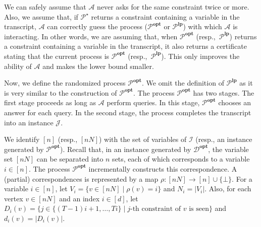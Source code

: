 \documentclass[letterpaper, 11pt]{article}
\newcommand{\calA}{\mathcal{A}}
\newcommand{\calD}{\mathcal{D}}
\newcommand{\calI}{\mathcal{I}}
\newcommand{\calJ}{\mathcal{J}}
\newcommand{\calP}{\mathcal{P}}
\newcommand{\lp}{\mathbf{lp}}
\newcommand{\opt}{\mathbf{opt}}
\begin{document}
We can safely assume that $\calA$ never asks for the same constraint twice or more.
Also, we assume that,
if $\calP^{\star}$ returns a constraint containing a variable in the transcript,
$\calA$ can correctly guess the process ($\calP^{\opt}$ or $\calP^{\lp}$) with which $\calA$ is interacting.
In other words,
we are assuming that, 
when $\calP^{\opt}$ (resp.,~$\calP^{\lp}$) returns a constraint containing a variable in the transcript,
it also returns a certificate stating that the current process is $\calP^{\opt}$ (resp.,~$\calP^{\lp}$).
This only improves the ability of $\calA$ and makes the lower bound smaller.

Now, we define the randomized process $\calP^{\opt}$.
We omit the definition of $\calP^{\lp}$ as it is very similar to the construction of $\calP^{\opt}$.
The process $\calP^{\opt}$ has two stages.
The first stage proceeds as long as $\calA$ perform queries.
In this stage, 
$\calP^{\opt}$ chooses an answer for each query.
In the second stage, 
the process completes the transcript into an instance $\calJ$.

We identify $[n]$ (resp., $[nN]$) with the set of variables of $\calI$ (resp., an instance generated by $\calP^{\opt}$).
Recall that,
in an instance generated by $\calD^{\opt}$,
the variable set $[nN]$ can be separated into $n$ sets,
each of which corresponds to a variable $i\in [n]$.
The process $\calP^{\opt}$ incrementally constructs this correspondence.
A (partial) correspondences is represented by a map $\rho \colon [nN] \to [n] \cup \{\bot\}$.
For a variable $i \in [n]$,
let $V_i = \{v \in [nN] \mid \rho(v) = i\}$ and $N_i = |V_i|$.
Also, for each vertex $v \in [nN]$ and an index $i \in [d]$,
let $D_{i}(v) = \{j \in \{(T-1)i+1, \ldots, Ti \} \mid \text{$j$-th constraint of $v$ is seen}\}$ and $d_i(v) = |D_i(v)|$.
\end{document}
